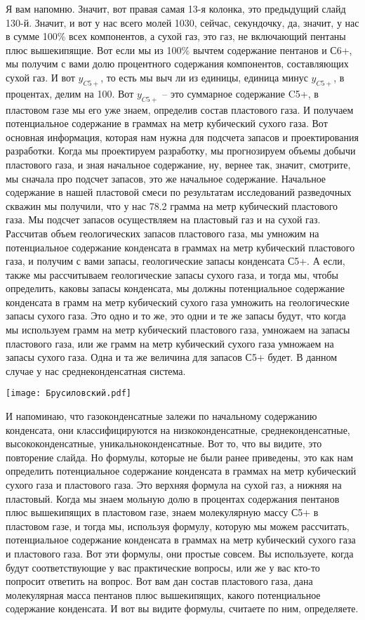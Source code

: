 \documentclass[main.tex]{subfiles}
\begin{document}
Я вам напомню.
Значит, вот правая самая 13-я колонка, это предыдущий слайд 130-й.
Значит, и вот у нас всего молей 1030, сейчас, секундочку, да, значит, у нас в сумме 100\% всех компонентов, а сухой газ, это газ, не включающий пентаны плюс вышекипящие.
Вот если мы из 100\% вычтем содержание пентанов и С6+, мы получим с вами долю процентного содержания компонентов, составляющих сухой газ.
И вот $y_{C5+}$, то есть мы выч ли из единицы, единица минус $y_{C5+}$, в процентах, делим на 100.
Вот $y_{C5+}$ -- это суммарное содержание C5+, в пластовом газе мы его уже знаем, определив состав пластового газа.
И получаем потенциальное содержание в граммах на метр кубический сухого газа.
Вот основная информация, которая нам нужна для подсчета запасов и проектирования разработки.
Когда мы проектируем разработку, мы прогнозируем объемы добычи пластового газа, и зная начальное содержание, ну, вернее так, значит, смотрите, мы сначала про подсчет запасов, это же начальное содержание.
Начальное содержание в нашей пластовой смеси по результатам исследований разведочных скважин мы получили, что у нас 78.2 грамма на метр кубический пластового газа.
Мы подсчет запасов осуществляем на пластовый газ и на сухой газ.
Рассчитав объем геологических запасов пластового газа, мы умножим на потенциальное содержание конденсата в граммах на метр кубический пластового газа, и получим с вами запасы, геологические запасы конденсата С5+.
А если, также мы рассчитываем геологические запасы сухого газа, и тогда мы, чтобы определить, каковы запасы конденсата, мы должны потенциальное содержание конденсата в грамм на метр кубический сухого газа умножить на геологические запасы сухого газа.
Это одно и то же, это одни и те же запасы будут, что когда мы используем грамм на метр кубический пластового газа, умножаем на запасы пластового газа, или же грамм на метр кубический сухого газа умножаем на запасы сухого газа.
Одна и та же величина для запасов С5+ будет.
В данном случае у нас среднеконденсатная система.

\begin{center}
\texttt{[image: Брусиловский.pdf]}
\end{center}

И напоминаю, что газоконденсатные залежи по начальному содержанию конденсата, они классифицируются на низкоконденсатные, среднеконденсатные, высококонденсатные, уникальноконденсатные.
Вот то, что вы видите, это повторение слайда.
Но формулы, которые не были ранее приведены, это как нам определить потенциальное содержание конденсата в граммах на метр кубический сухого газа и пластового газа.
Это верхняя формула на сухой газ, а нижняя на пластовый.
Когда мы знаем мольную долю в процентах содержания пентанов плюс вышекипящих в пластовом газе, знаем молекулярную массу С5+ в пластовом газе, и тогда мы, используя формулу, которую мы можем рассчитать, потенциальное содержание конденсата в граммах на метр кубический сухого газа и пластового газа.
Вот эти формулы, они простые совсем.
Вы используете, когда будут соответствующие у вас практические вопросы, или же у вас кто-то попросит ответить на вопрос.
Вот вам дан состав пластового газа, дана молекулярная масса пентанов плюс вышекипящих, какого потенциальное содержание конденсата.
И вот вы видите формулы, считаете по ним, определяете.
\end{document}
